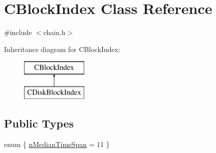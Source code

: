 \hypertarget{class_c_block_index}{}\section{C\+Block\+Index Class Reference}
\label{class_c_block_index}


{\ttfamily \#include $<$chain.\+h$>$}

Inheritance diagram for C\+Block\+Index\+:\begin{figure}[H]
\begin{center}
\leavevmode
\includegraphics[height=2.000000cm]{class_c_block_index}
\end{center}
\end{figure}
\subsection*{Public Types}
\begin{DoxyCompactItemize}
\item 
enum \{ \mbox{\hyperlink{class_c_block_index_acefc16035e60d7bd52ed2c9bb1aa838eaa2b8ad73c4fe37a8de8748d949c334d4}{n\+Median\+Time\+Span}} = 11
 \}
\end{DoxyCompactItemize}
